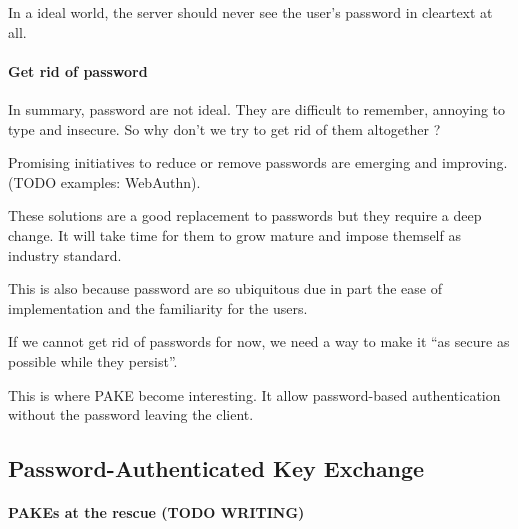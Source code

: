 \documentclass[../report.tex]{subfiles}
\begin{document}
In a ideal world, the server should never see the user's password in cleartext at all.


\paragraph{Get rid of password}

In summary, password are not ideal. They are difficult to remember, annoying to type and insecure.
So why don't we try to get rid of them altogether ?

Promising initiatives to reduce or remove passwords are emerging and improving. (TODO examples: WebAuthn).

These solutions are a good replacement to passwords but they require a deep change. It will take time for them to grow mature and impose themself as industry standard.

This is also because password are so ubiquitous due in part the ease of implementation and the familiarity for the users.

If we cannot get rid of passwords for now, we need a way to make it ``as secure as possible while they persist''.



This is where PAKE become interesting. It allow password-based authentication without the password leaving the client.




\subsection{Password-Authenticated Key Exchange}
\paragraph{PAKEs at the rescue (TODO WRITING)} %

% 


\end{document}
